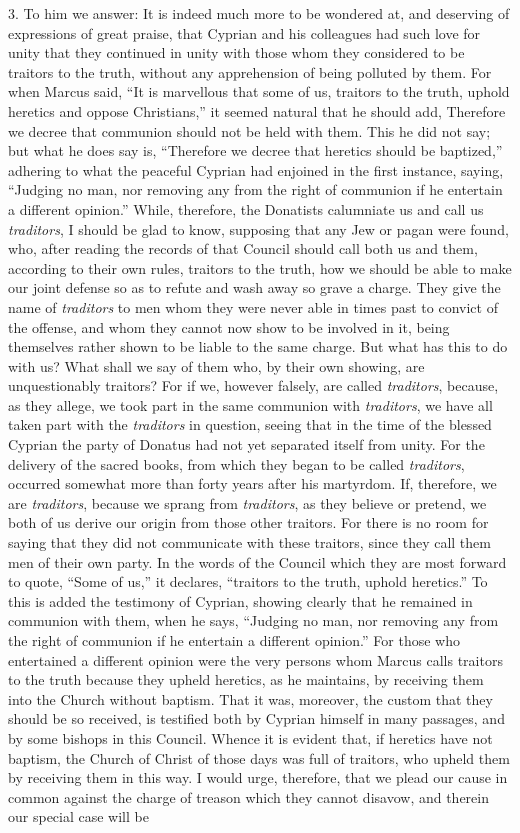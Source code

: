 3. To him we answer: It is indeed much more to be wondered at, and deserving of expressions of great praise, that Cyprian and his colleagues had such love for unity that they continued in unity with those whom they considered to be traitors to the truth, without any apprehension of being polluted by them. For when Marcus said, ``It is marvellous that some of us, traitors to the truth, uphold heretics and oppose Christians,'' it seemed natural that he should add, Therefore we decree that communion should not be held with them. This he did not say; but what he does say is, ``Therefore we decree that heretics should be baptized,'' adhering to what the peaceful Cyprian had enjoined in the first instance, saying, ``Judging no man, nor removing any from the right of communion if he entertain a different opinion.'' While, therefore, the Donatists calumniate us and call us \emph{ traditors}, I should be glad to know, supposing that any Jew or pagan were found, who, after reading the records of that Council should call both us and them, according to their own rules, traitors to the truth, how we should be able to make our joint defense so as to refute and wash away so grave a charge. They give the name of \emph{traditors} to men whom they were never able in times past to convict of the offense, and whom they cannot now show to be involved in it, being themselves rather shown to be liable to the same charge. But what has this to do with us? What shall we say of them who, by their own showing, are unquestionably traitors? For if we, however falsely, are called \emph{traditors}, because, as they allege, we took part in the same communion with \emph{traditors}, we have all taken part with the \emph{traditors} in question, seeing that in the time of the blessed Cyprian the party of Donatus had not yet separated itself from unity. For the delivery of the sacred books, from which they began to be called \emph{traditors}, occurred somewhat more than forty years after his martyrdom. If, therefore, we are \emph{ traditors}, because we sprang from \emph{traditors}, as they believe or pretend, we both of us derive our origin from those other traitors. For there is no room for saying that they did not communicate with these traitors, since they call them men of their own party. In the words of the Council which they are most forward to quote, ``Some of us,'' it declares, ``traitors to the truth, uphold heretics.'' To this is added the testimony of Cyprian, showing clearly that he remained in communion with them, when he says, ``Judging no man, nor removing any from the right of communion if he entertain a different opinion.'' For those who entertained a different opinion were the very persons whom Marcus calls traitors to the truth because they upheld heretics, as he maintains, by receiving them into the Church without baptism. That it was, moreover, the custom that they should be so received, is testified both by Cyprian himself in many passages, and by some bishops in this Council. Whence it is evident that, if heretics have not baptism, the Church of Christ of those days was full of traitors, who upheld them by receiving them in this way. I would urge, therefore, that we plead our cause in common against the charge of treason which they cannot disavow, and therein our special case will be 